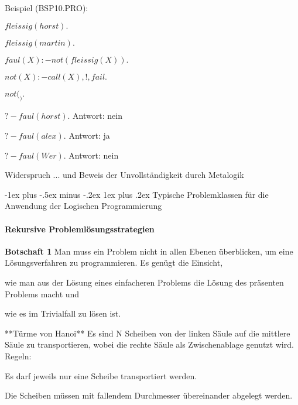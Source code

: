 \documentclass[a4paper]{article}
\makeatletter
\renewcommand{\note}[2]{\begin{noteBox} \textbf{#1} #2 \end{noteBox}}
\renewcommand{\subsubsection}{\@startsection{subsubsection}{3}{0mm}%
                {-1ex plus -.5ex minus -.2ex}%
                {1ex plus .2ex}%
                {\normalfont\small\bfseries}}
\makeatother
\begin{document}
\begin{multicols}{3}
  Beispiel (BSP10.PRO):
  \begin{enumerate*}
    \item $fleissig(horst).$
    \item $fleissig(martin).$
    \item $faul(X) :- not( fleissig(X) ).$
    \item $not(X) :- call(X), !, fail.$
    \item $not( _ ).$
  \end{enumerate*}
  \begin{itemize*}
    \item $?- faul(horst).$ Antwort: nein
    \item $?- faul(alex).$ Antwort: ja
    \item $?- faul(Wer).$ Antwort: nein
  \end{itemize*}

  Widerspruch ... und Beweis der Unvollständigkeit durch Metalogik

  \subsubsection{Typische Problemklassen für die Anwendung der Logischen Programmierung}
  \paragraph{Rekursive Problemlösungsstrategien}
  \note{Botschaft  1}{Man muss ein Problem nicht in allen Ebenen überblicken, um eine Lösungsverfahren zu programmieren. Es genügt die Einsicht,
    \begin{enumerate*}
      \item wie man aus der Lösung eines einfacheren Problems die Lösung des präsenten Problems macht und
      \item wie es im Trivialfall zu lösen ist.
    \end{enumerate*}
  }

  **Türme von Hanoi**
  Es sind N Scheiben von der linken Säule auf die mittlere Säule zu transportieren, wobei die rechte Säule als Zwischenablage genutzt wird. Regeln:
  \begin{enumerate*}
    \item Es darf jeweils nur eine Scheibe transportiert werden.
    \item Die Scheiben müssen mit fallendem Durchmesser übereinander abgelegt werden.
  \end{enumerate*}


\end{multicols}
\end{document}
